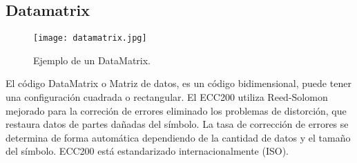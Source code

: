 \subsection{Datamatrix}

\begin{figure} 
	\centering
	\texttt{[image: datamatrix.jpg]}
	\caption{Ejemplo de un DataMatrix.}
	\label{fig:DataMatrixRectNormal}
\end{figure}
El código DataMatrix o Matriz de datos, es un código bidimensional, puede tener una configuración cuadrada o rectangular. 
El ECC200 utiliza Reed-Solomon mejorado para la correción de errores eliminado los problemas de distorción, que restaura datos de partes dañadas del símbolo. La tasa de corrección de errores se determina de forma automática dependiendo de la cantidad de datos y el tamaño del símbolo. ECC200 está estandarizado internacionalmente (ISO).\cite{2006_Semacode_TECH_REPORT}


